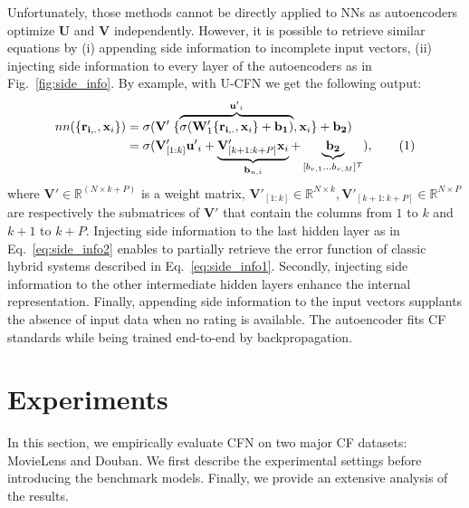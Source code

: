 \documentclass{article}
\newcommand\numberthis{\addtocounter{equation}{1}\tag{\theequation}}
\newcommand{\mtx}[1]{\ensuremath{\mathbf{#1}}}
\newcommand{\usparse}{\mtx{r_{i,.}}}
\begin{document}
Unfortunately, those methods cannot be directly applied to NNs as autoencoders optimize $\mtx{U}$ and $\mtx{V}$ independently. However, it is possible to retrieve similar equations by (i) appending side information to incomplete input vectors, (ii) injecting side information to every layer of the autoencoders as in Fig.~\ref{fig:side_info}. By example, with U-CFN we get the following output:
\begin{align*}
nn(\{ \usparse, \mtx{x}_i\})&= \sigma(\mtx{V}' \;
\{\overbrace{\sigma( \mtx{W}'_1 \{\usparse, \mtx{x}_i\} + \mtx{b_1} )}^{\mtx{u'}_i}, \mtx{x}_i\}  + \mtx{b_2}) \\
&= \sigma(\mtx{V}'_{[1:k]}\mtx{u'}_i +  \underbrace{\mtx{V}'_{[k+1:k+P]}\mtx{x}_i}_{\mtx{b}_{u,i}} + \underbrace{\mtx{b_2}}_{[b_{v,1}\dots b_{v,M}]^T}), \numberthis \label{eq:side_info2} 
\end{align*}
where $\mtx{V}' \in \mathbb{R}^ {(N \times k+P)}$ is a weight matrix, $\mtx{V}'_{[1:k]} \in \mathbb{R}^ {N \times k}, \mtx{V}'_{[k+1:k+P]} \in \mathbb{R}^ {N \times P}$ are respectively the submatrices of $\mtx{V}'$ that contain the columns from $1$ to $k$ and $k+1$ to $k+P$. 
Injecting side information to the last hidden layer as in Eq.~\ref{eq:side_info2} enables to partially retrieve the error function of classic hybrid systems described in Eq.~\ref{eq:side_info1}. Secondly, injecting side information to the other intermediate hidden layers enhance the internal representation. Finally, appending side information to the input vectors supplants the absence of input data when no rating is available. The autoencoder fits CF standards while being trained end-to-end by backpropagation. 

\section{Experiments}
\label{sec:exp}
In this section, we empirically evaluate CFN on two major CF datasets: MovieLens and Douban. We first describe the experimental settings before introducing the benchmark models. Finally, we provide an extensive analysis of the results.
\end{document}
